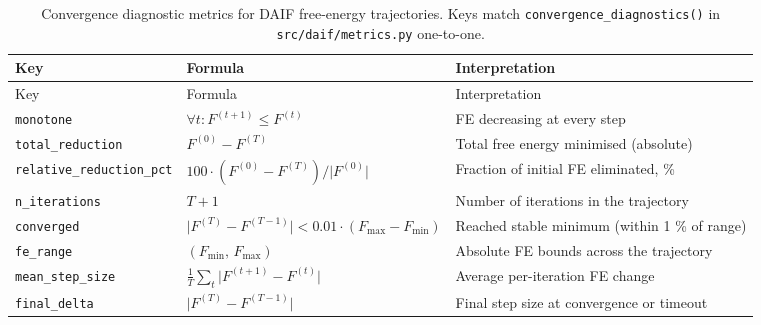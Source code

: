 \documentclass[
]{article}
\begin{document}
\begin{longtable}[]{@{}
  >{\raggedright\arraybackslash}p{}
  >{\raggedright\arraybackslash}p{}
  >{\raggedright\arraybackslash}p{}@{}}
\caption{Convergence diagnostic metrics for DAIF free-energy
trajectories. Keys match \protect\texttt{convergence\_diagnostics()} in
\protect\texttt{src/daif/metrics.py}
one-to-one.}\label{tbl:convergence-metrics}\tabularnewline
\toprule\noalign{}
\begin{minipage}[b]{\linewidth}\raggedright
Key
\end{minipage} & \begin{minipage}[b]{\linewidth}\raggedright
Formula
\end{minipage} & \begin{minipage}[b]{\linewidth}\raggedright
Interpretation
\end{minipage} \\
\midrule\noalign{}
\endfirsthead
\toprule\noalign{}
\begin{minipage}[b]{\linewidth}\raggedright
Key
\end{minipage} & \begin{minipage}[b]{\linewidth}\raggedright
Formula
\end{minipage} & \begin{minipage}[b]{\linewidth}\raggedright
Interpretation
\end{minipage} \\
\midrule\noalign{}
\endhead
\bottomrule\noalign{}
\endlastfoot
\texttt{monotone} & \(\forall t: F^{(t+1)} \leq F^{(t)}\) & FE
decreasing at every step \\
\texttt{total\_reduction} & \(F^{(0)} - F^{(T)}\) & Total free energy
minimised (absolute) \\
\texttt{relative\_reduction\_pct} &
\(100\cdot (F^{(0)} - F^{(T)}) / \lvert F^{(0)}\rvert\) & Fraction of
initial FE eliminated, \% \\
\texttt{n\_iterations} & \(T + 1\) & Number of iterations in the
trajectory \\
\texttt{converged} &
\(\lvert F^{(T)} - F^{(T-1)}\rvert < 0.01\cdot(F_{\max} - F_{\min})\) &
Reached stable minimum (within 1 \% of range) \\
\texttt{fe\_range} & \((F_{\min},\, F_{\max})\) & Absolute FE bounds
across the trajectory \\
\texttt{mean\_step\_size} &
\(\tfrac{1}{T}\sum_{t} \lvert F^{(t+1)} - F^{(t)}\rvert\) & Average
per-iteration FE change \\
\texttt{final\_delta} & \(\lvert F^{(T)} - F^{(T-1)}\rvert\) & Final
step size at convergence or timeout \\
\end{longtable}
\end{document}
